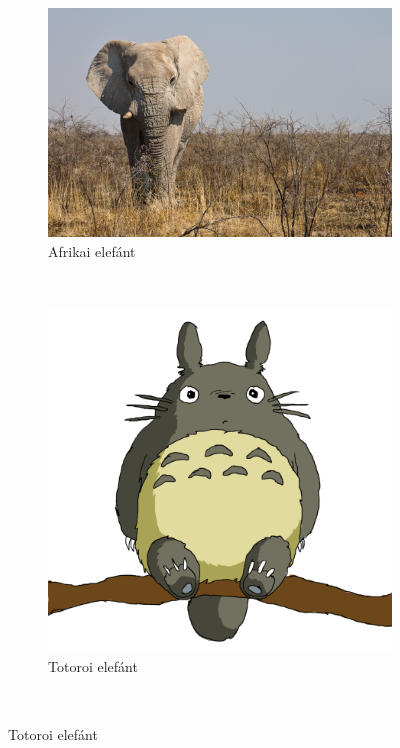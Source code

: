 \documentclass[a4paper]{article}
\begin{document}
\begin{figure}
	\centering
	\begin{subfigure}[t]{0.3\textwidth}
		\centering
		\includegraphics[width=\textwidth]{elefant.jpg}
		\caption{Afrikai elefánt}
	\end{subfigure}\\
	\begin{subfigure}[t]{0.3\textwidth}
		\centering
		\includegraphics[width=\textwidth]{totoro.png}
		\caption{Totoroi elefánt}
	\end{subfigure}\\

\end{figure}
\end{document}
